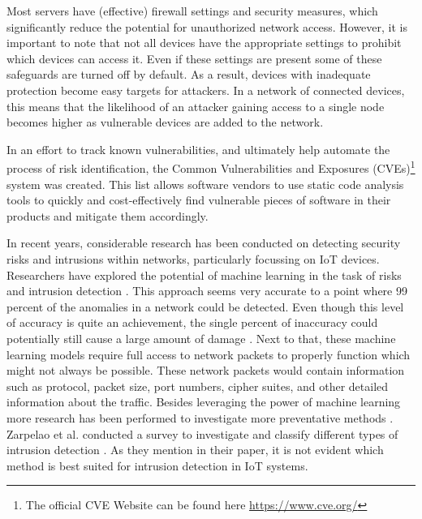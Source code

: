 Most servers have (effective) firewall settings and security measures, which significantly reduce the potential for unauthorized network access. However, it is important to note that not all devices have the appropriate settings to prohibit which devices can access it. Even if these settings are present some of these safeguards are turned off by default. As a result, devices with inadequate protection become easy targets for attackers. In a network of connected devices, this means that the likelihood of an attacker gaining access to a single node becomes higher as vulnerable devices are added to the network.

In an effort to track known vulnerabilities, and ultimately help automate the process of risk identification, the Common Vulnerabilities and Exposures (CVEs)\footnote{The official CVE Website can be found here \url{https://www.cve.org/} } system was created. This list allows software vendors to use static code analysis tools to quickly and cost-effectively find vulnerable pieces of software in their products and mitigate them accordingly. 


In recent years, considerable research has been conducted on detecting security risks and intrusions within networks, particularly focussing on IoT devices. Researchers have explored the potential of machine learning in the task of risks and intrusion detection \cite{canedo2016using, doshi2018machine, hamza2019detecting, sivanathan2018classifying}. This approach seems very accurate to a point where 99 percent of the anomalies in a network could be detected. Even though this level of accuracy is quite an achievement, the single percent of inaccuracy could potentially still cause a large amount of damage \cite{wei2018casino}. Next to that, these machine learning models require full access to network packets to properly function which might not always be possible. These network packets would contain information such as protocol, packet size, port numbers, cipher suites, and other detailed information about the traffic. Besides leveraging the power of machine learning more research has been performed to investigate more preventative methods \cite{miettinen2017iot, hamza2019detecting, paudel2019detecting}. Zarpelao et al. conducted a survey to investigate and classify different types of intrusion detection \cite{zarpelao2017survey}. As they mention in their paper, it is not evident which method is best suited for intrusion detection in IoT systems. 

